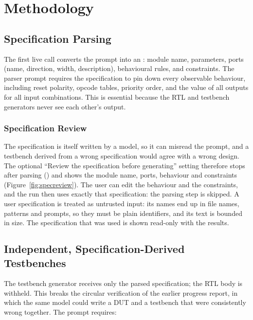 \chapter{Methodology}
\label{sec:method}

\section{Specification Parsing}
The first live call converts the prompt into an : module name,
parameters, ports (name, direction, width, description), behavioural rules, and
constraints. The parser prompt requires the specification to pin down every
observable behaviour, including reset polarity, opcode tables, priority order, and
the value of all outputs for all input combinations. This is essential because the
RTL and testbench generators never see each other's output.

\subsection{Specification Review}
\label{sec:specreview}
The specification is itself written by a model, so it can misread the prompt, and a
testbench derived from a wrong specification would agree with a wrong design. The
optional ``Review the specification before generating'' setting therefore stops after
parsing () and shows the module name, ports, behaviour and
constraints (Figure~\ref{fig:specreview}). The user can edit the behaviour and the
constraints, and the run then uses exactly that specification: the parsing step is
skipped. A user specification is treated as untrusted input: its names end up in file
names, patterns and prompts, so they must be plain identifiers, and its text is
bounded in size. The specification that was used is
shown read-only with the results.


\section{Independent, Specification-Derived Testbenches}
\label{sec:tb}
The testbench generator receives only the parsed specification; the RTL body is
withheld. This breaks the circular verification of the earlier progress report, in
which the same model could write a DUT and a testbench that were consistently wrong
together. The prompt requires:

